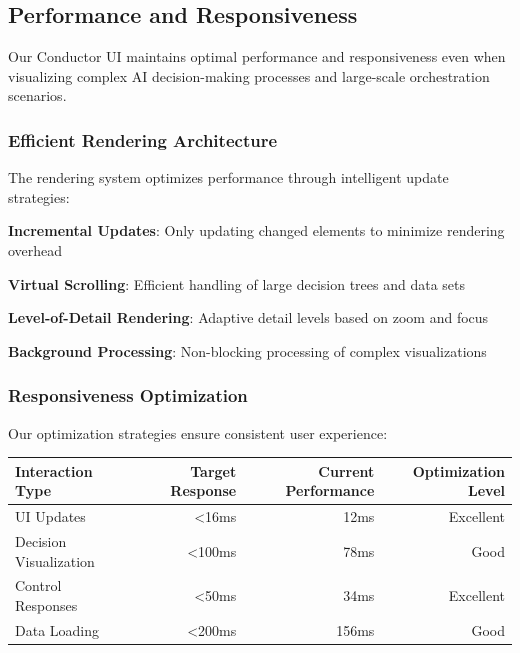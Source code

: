 \subsection*{Performance and Responsiveness}

Our Conductor UI maintains optimal performance and responsiveness even when visualizing complex AI decision-making processes and large-scale orchestration scenarios.

\subsubsection*{Efficient Rendering Architecture}

The rendering system optimizes performance through intelligent update strategies:

\begin{expandedlist}
    \item \textbf{Incremental Updates}: Only updating changed elements to minimize rendering overhead
    \item \textbf{Virtual Scrolling}: Efficient handling of large decision trees and data sets
    \item \textbf{Level-of-Detail Rendering}: Adaptive detail levels based on zoom and focus
    \item \textbf{Background Processing}: Non-blocking processing of complex visualizations
\end{expandedlist}

\subsubsection*{Responsiveness Optimization}

Our optimization strategies ensure consistent user experience:

\begin{center}
\begin{tabular}{@{}lrrr@{}}
\toprule
\textbf{Interaction Type} & \textbf{Target Response} & \textbf{Current Performance} & \textbf{Optimization Level} \\
\midrule
UI Updates & <16ms & 12ms & Excellent \\
Decision Visualization & <100ms & 78ms & Good \\
Control Responses & <50ms & 34ms & Excellent \\
Data Loading & <200ms & 156ms & Good \\
\bottomrule
\end{tabular}
\end{center}

